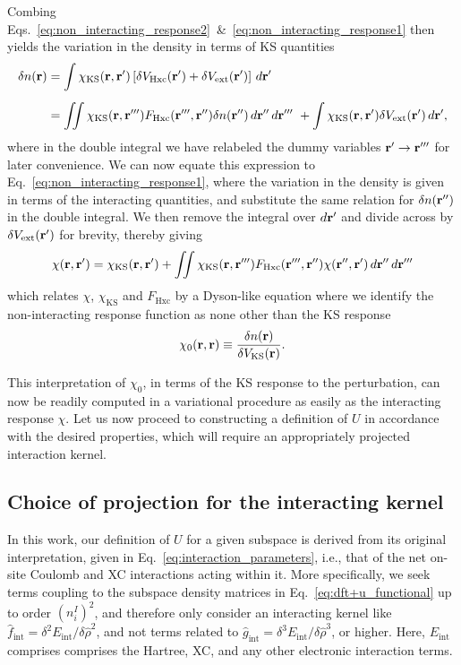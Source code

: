 Combing Eqs.~\eqref{eq:non_interacting_response2}~\&~\eqref{eq:non_interacting_response1} 
then yields the variation in the density 
in terms of KS quantities 
%
\begin{align}
\delta n({{\bf r}})
&=\int \chi_\textrm{KS}({{\bf r}}, {{\bf r}'}) \left[\delta V_\textrm{Hxc}({{\bf r}'})+\delta V_\textrm{ext}({{\bf r}'})\right]\, d{{\bf r}'} \\[0.5em]
&=\iint \chi_\textrm{KS}({{\bf r}}, {{\bf r}'''}) F_\textrm{Hxc}({{\bf r}'''},{{\bf r}''})\delta n({{\bf r}''})\, d{{\bf r}''} 
\, d{{\bf r}'''}\
+\int \chi_\textrm{KS}({{\bf r}}, {{\bf r}'}) \delta V_\textrm{ext}({{\bf r}'})\, d{{\bf r}'}, \nonumber
\end{align}
%
where in the double integral 
we have relabeled the dummy variables 
${\bf r}'\to {\bf r}'''$ 
for later convenience.
%
We can now equate this expression to 
Eq.~\eqref{eq:non_interacting_response1}, 
where the variation in the density is given 
in terms of the interacting quantities, 
and substitute the same relation for $\delta n({{\bf r}''})$  
in the double integral.
%
We then remove the integral over $d{\bf r}'$ 
and divide across by $\delta V_\textrm{ext}({\bf r}')$ 
for brevity, thereby giving 
%
\begin{equation}
\chi({{\bf r}}, {{\bf r}'})= \chi_\textrm{KS}({{\bf r}}, {{\bf r}'}) +\iint \chi_\textrm{KS}({{\bf r}}, {{\bf r}'''}) F_\textrm{Hxc}({{\bf r}'''},{{\bf r}''})\chi({{\bf r}''}, {{\bf r}'})\,d{{\bf r}''} \, d{{\bf r}'''} 
\end{equation}
%
which relates 
$\chi$, $\chi_\textrm{KS}$ and $F_\textrm{Hxc}$ 
by a Dyson-like equation where 
we identify the non-interacting response
function as none other than the KS response
%
\begin{equation}
\chi_0({\bf r},{\bf r})\equiv\frac{\delta n({\bf r})}{\delta V_\textrm{KS}({\bf r})}.
\end{equation}
%

This interpretation of $\chi_0$, 
in terms of the KS response to the perturbation, 
can now be readily computed 
in a variational procedure 
as easily as the interacting response $\chi$. 
%
Let us now proceed to constructing a definition of $U$ 
in accordance with the desired properties, 
which will require an appropriately projected interaction kernel. 
%



\subsection{Choice of projection for the interacting kernel}

In this work, 
our definition of $U$ for a given subspace 
is derived from  its original interpretation, given in 
Eq.~\eqref{eq:interaction_parameters}, 
i.e., that of the {net on-site Coulomb and XC} interactions 
acting within it.
%
More specifically, 
we seek terms coupling to the 
subspace density matrices in Eq.~\eqref{eq:dft+u_functional} 
up to order $( n_i^{I} )^2$, 
and therefore only consider 
an interacting kernel like
$\hat{f}_\textrm{int} = \delta^2 E_\textrm{int} / \delta \hat{\rho}^2$, 
and not terms related to 
$\hat{g}_\textrm{int} = \delta^3 E_\textrm{int} / \delta \hat{\rho}^3$, 
or higher.
%
Here, 
$E_\textrm{int}$ comprises comprises 
the Hartree, XC, and any other electronic interaction terms.

